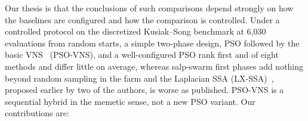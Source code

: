 Our thesis is that the conclusions of such comparisons depend strongly on how the baselines are configured and how the comparison is controlled. Under a controlled protocol on the discretized Kusiak--Song benchmark at 6,030 evaluations from random starts, a simple two-phase design, PSO followed by the basic VNS~\cite{Mladenovic1997,Hansen2001} (PSO-VNS), and a well-configured PSO rank first and \NPSOPos{} of eight methods and differ little on average, whereas salp-swarm first phases add nothing beyond random sampling in the farm and the Laplacian SSA (LX-SSA)~\cite{Solanki2023}, proposed earlier by two of the authors, is worse as published. PSO-VNS is a sequential hybrid in the memetic sense, not a new PSO variant.
Our contributions are:
